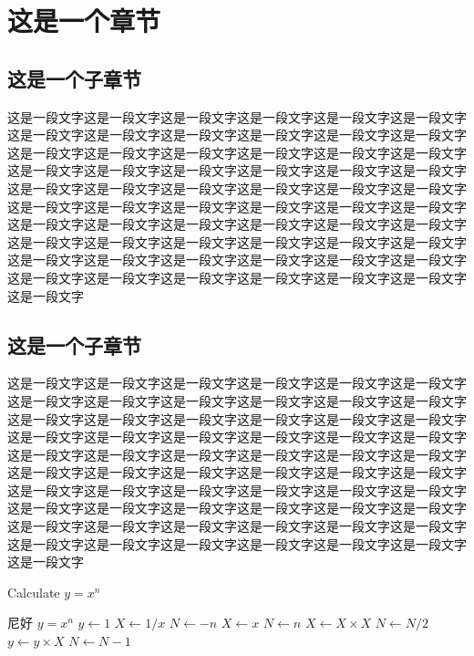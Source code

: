 \documentclass{FJNUthesis}
\begin{document}
 
	\makeCover
	\newpage
	\myAbstract
	\newpage
	\tableofcontents
	\newpage
	\section{这是一个章节}
	\subsection{这是一个子章节}
	这是一段文字这是一段文字这是一段文字这是一段文字这是一段文字这是一段文字这是一段文字这是一段文字这是一段文字这是一段文字这是一段文字这是一段文字这是一段文字这是一段文字这是一段文字这是一段文字这是一段文字这是一段文字这是一段文字这是一段文字这是一段文字这是一段文字这是一段文字这是一段文字这是一段文字这是一段文字这是一段文字这是一段文字这是一段文字这是一段文字这是一段文字这是一段文字这是一段文字这是一段文字这是一段文字这是一段文字这是一段文字这是一段文字这是一段文字这是一段文字这是一段文字这是一段文字这是一段文字这是一段文字这是一段文字这是一段文字这是一段文字这是一段文字这是一段文字这是一段文字这是一段文字这是一段文字这是一段文字这是一段文字这是一段文字这是一段文字这是一段文字这是一段文字这是一段文字这是一段文字这是一段文字
	\subsection{这是一个子章节}
	这是一段文字这是一段文字这是一段文字这是一段文字这是一段文字这是一段文字这是一段文字这是一段文字这是一段文字这是一段文字这是一段文字这是一段文字这是一段文字这是一段文字这是一段文字这是一段文字这是一段文字这是一段文字这是一段文字这是一段文字这是一段文字这是一段文字这是一段文字这是一段文字这是一段文字这是一段文字这是一段文字这是一段文字这是一段文字这是一段文字这是一段文字这是一段文字这是一段文字这是一段文字这是一段文字这是一段文字这是一段文字这是一段文字这是一段文字这是一段文字这是一段文字这是一段文字这是一段文字这是一段文字这是一段文字这是一段文字这是一段文字这是一段文字这是一段文字这是一段文字这是一段文字这是一段文字这是一段文字这是一段文字这是一段文字这是一段文字这是一段文字这是一段文字这是一段文字这是一段文字这是一段文字
	
	
	\begin{algorithm} 
		\caption{Calculate $y = x^n$} 
		\label{alg3} 
		\begin{algorithmic}
			\REQUIRE 尼好
			\ENSURE $y = x^n$ 
			\STATE $y \gets 1$ 
			\STATE $X \gets 1 / x$ 
			\STATE $N \gets -n$ 
			\ELSE 
			\STATE $X \gets x$ 
			\STATE $N \gets n$ 
			\ENDIF 
			\STATE $X \gets X \times X$ 
			\STATE $N \gets N / 2$ 
			\ELSE[$N$ is odd] \STATE $y \gets y \times X$ 
			\STATE $N \gets N - 1$ 
			\ENDIF 
			\ENDWHILE 
		\end{algorithmic} 
	\end{algorithm}
\end{document}
